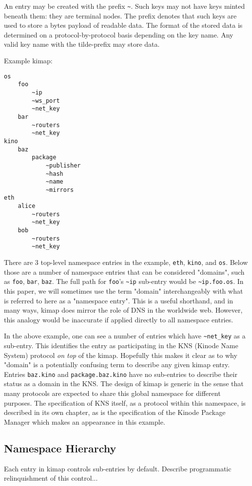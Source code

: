 \documentclass[runningheads]{llncs}
\begin{document}
An entry may be created with the prefix \verb|~|. Such keys may not have keys minted beneath them: they are terminal nodes. The prefix denotes that such keys are used to store a bytes payload of readable data. The format of the stored data is determined on a protocol-by-protocol basis depending on the key name. Any valid key name with the tilde-prefix may store data.

Example kimap:
\begin{lstlisting}
os
    foo
        ~ip
        ~ws_port
        ~net_key
    bar
        ~routers
        ~net_key
kino
    baz
        package
            ~publisher
            ~hash
            ~name
            ~mirrors
eth
    alice
        ~routers
        ~net_key
    bob
        ~routers
        ~net_key
\end{lstlisting}

There are 3 top-level namespace entries in the example, \verb|eth|, \verb|kino|, and \verb|os|.
Below those are a number of namespace entries that can be considered "domains", such as \verb|foo|, \verb|bar|, \verb|baz|.
The full path for \verb|foo|'s \verb|~ip| sub-entry would be \verb|~ip.foo.os|.
In this paper, we will sometimes use the term "domain" interchangeably with what is referred to here as a "namespace entry".
This is a useful shorthand, and in many ways, kimap does mirror the role of DNS in the worldwide web.
However, this analogy would be inaccurate if applied directly to all namespace entries.

In the above example, one can see a number of entries which have \verb|~net_key| as a sub-entry.
This identifies the entry as participating in the KNS (Kinode Name System) protocol \textit{on top} of the kimap.
Hopefully this makes it clear as to why "domain" is a potentially confusing term to describe any given kimap entry.
Entries \verb|baz.kino| and \verb|package.baz.kino| have no sub-entries to describe their status as a domain in the KNS.
The design of kimap is generic in the sense that many protocols are expected to share this global namespace for different purposes.
The specification of KNS itself, as a protocol within this namespace, is described in its own chapter, as is the specification of the Kinode Package Manager which makes an appearance in this example.

\subsection{Namespace Hierarchy}

Each entry in kimap controls sub-entries by default. Describe programmatic relinquishment of this control...
\end{document}
